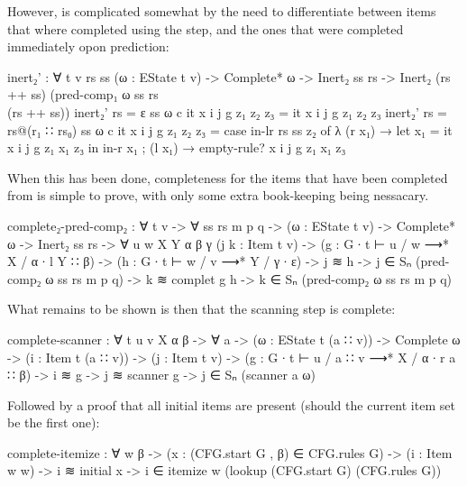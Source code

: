 		However,  is complicated somewhat by the need to
		differentiate between items that where completed using the
		 step, and the ones that were completed immediately opon
		prediction:

		\begin{code}
			inert₂' : ∀ {t v rs ss} (ω : EState t v) ->
			  Complete* ω ->
			  Inert₂ ss rs ->
			  Inert₂ (rs ++ ss) (pred-comp₁ ω ss rs \\ (rs ++ ss))
			inert₂' {rs = ε} {ss} ω c it x i j g z₁ z₂ z₃ = it x i j g z₁ z₂ z₃
			inert₂' {rs = rs@(r₁ ∷ rs₀)} {ss} ω c it x i j g z₁ z₂ z₃ =
			  case in-lr rs ss z₂ of
			    λ { (r x₁) →
			      let x₁ = it x i j g z₁ x₁ z₃  in
			      in-r x₁
			    ; (l x₁) → empty-rule? x i j g z₁ x₁ z₃
			    }
		\end{code}

		When this has been done, completeness for the items that have been
		completed from  is simple to prove, with only some
		extra book-keeping being nessacary.

		\begin{code}
			complete₂-pred-comp₂ : ∀ {t v} -> ∀ ss rs m p q ->
			  (ω : EState t v) ->
			  Complete* ω ->
			  Inert₂ ss rs ->
			  ∀ {u w X Y α β γ}
			  (j k : Item t v) ->
			  (g : G ∙ t ⊢ u / w ⟶* X / α ∙ l Y ∷ β) ->
			  (h : G ∙ t ⊢ w / v ⟶* Y / γ ∙ ε) ->
			  j ≋ h -> j ∈ Sₙ (pred-comp₂ ω ss rs m p q) ->
			  k ≋ complet g h ->
			    k ∈ Sₙ (pred-comp₂ ω ss rs m p q)
		\end{code}

		What remains to be shown is then that the scanning step is complete:

		\begin{code}
			complete-scanner : ∀ {t u v X α β} -> ∀ a ->
			  (ω : EState t (a ∷ v)) ->
			  Complete ω ->
			  (i : Item t (a ∷ v)) ->
			  (j : Item t v) ->
			  (g : G ∙ t ⊢ u / a ∷ v ⟶* X / α ∙ r a ∷ β) ->
			  i ≋ g ->
			  j ≋ scanner g ->
			    j ∈ Sₙ (scanner a ω)
		\end{code}

		Followed by a proof that all initial items are present (should the
		current item set be the first one):

		\begin{code}
			complete-itemize : ∀ w {β} ->
			  (x : (CFG.start G , β) ∈ CFG.rules G) ->
			  (i : Item w w) ->
			  i ≋ initial x ->
			    i ∈ itemize w (lookup (CFG.start G) (CFG.rules G))
		\end{code}

